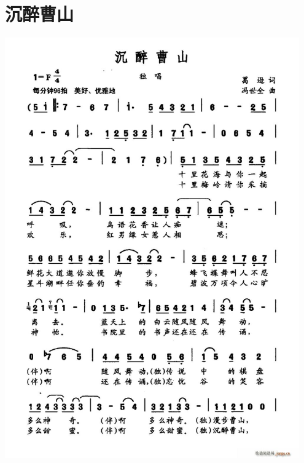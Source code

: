 \documentclass[cn,pad,twocol]{elegantbook}
\begin{document}
\section{沉醉曹山}
    \includegraphics[width=0.95\textwidth]{dongxiao/20200808-沉醉曹山.jpg}
\end{document}
